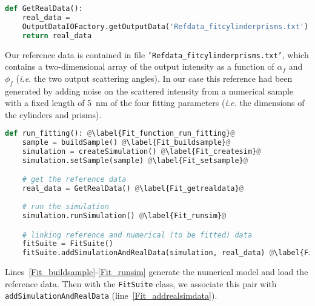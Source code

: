  


\begin{lstlisting}[language=python, style=eclipseboxed, name=exfit,nolol]
def GetRealData(): 
    real_data =
    OutputDataIOFactory.getOutputData('Refdata_fitcylinderprisms.txt') @\label{fit_input_realdata}@
    return real_data
\end{lstlisting}

Our reference data is contained in file 
\texttt{'Refdata\_fitcylinderprisms.txt'}, which contains a
two-dimensional array of the output intensity as a function of
$\alpha_f$ and $\phi_f$ (\textit{i.e.} the two output scattering
angles). In our case this reference had been generated by adding noise
on the scattered intensity from a numerical sample with a fixed length of 5~nm of the four fitting
parameters (\textit{i.e.} the dimensions of the cylinders and prisms).
 


\begin{lstlisting}[language=python, style=eclipseboxed,
  name=exfit,nolol]
def run_fitting(): @\label{Fit_function_run_fitting}@
    sample = buildSample() @\label{Fit_buildsample}@
    simulation = createSimulation() @\label{Fit_createsim}@
    simulation.setSample(sample) @\label{Fit_setsample}@

    # get the reference data
    real_data = GetRealData() @\label{Fit_getrealdata}@
    
    # run the simulation
    simulation.runSimulation() @\label{Fit_runsim}@

    # linking reference and numerical (to be fitted) data
    fitSuite = FitSuite() 
    fitSuite.addSimulationAndRealData(simulation, real_data) @\label{Fit_addrealsimdata}@
\end{lstlisting}


Lines~\ref{Fit_buildsample}-\ref{Fit_runsim} generate the numerical
model and load the reference data. Then with the \texttt{FitSuite}
class, we associate this pair with \texttt{addSimulationAndRealData}
(line~\ref{Fit_addrealsimdata}).\\



